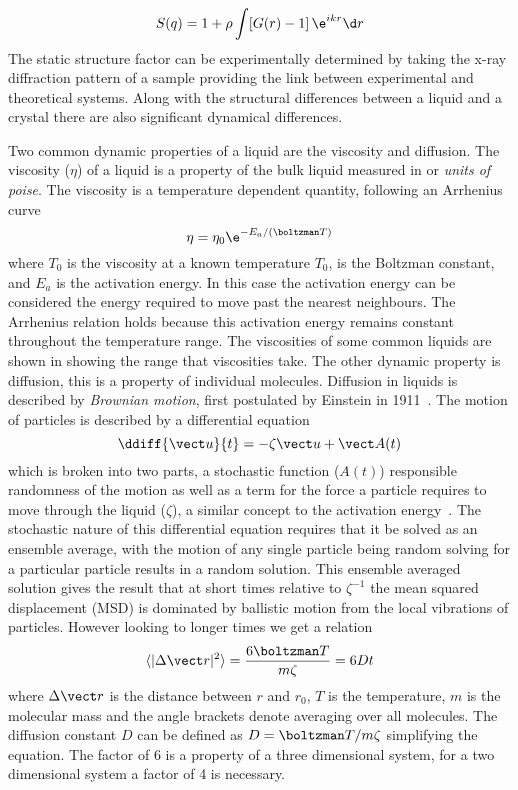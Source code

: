 \begin{equation}
    S(q) = 1 + \rho \int [G(r)-1]\,\e^{ikr} \d r
\end{equation}
The static structure factor can be experimentally determined by taking the x-ray diffraction pattern of a sample providing the link between experimental and theoretical systems. Along with the structural differences between a liquid and a crystal there are also significant dynamical differences.

\begin{figure}
    \caption{}
    \label{fig:radial distribution}
\end{figure}

Two common dynamic properties of a liquid are the viscosity and diffusion. The viscosity ($\eta$) of a liquid is a property of the bulk liquid measured in \si{\poise} or \emph{units of poise}. The viscosity is a temperature dependent quantity, following an Arrhenius curve
\begin{equation}
    \eta = \eta_0 \e^{-E_a/(\boltzman T)}
\end{equation}
where $T_0$ is the viscosity at a known temperature $T_0$, \boltzman is the Boltzman constant, and $E_a$ is the activation energy. In this case the activation energy can be considered the energy required to move past the nearest neighbours. The Arrhenius relation holds because this activation energy remains constant throughout the temperature range. The viscosities of some common liquids are shown in \tabref{} showing the range that viscosities take. The other dynamic property is diffusion, this is a property of individual molecules. Diffusion in liquids is described by \emph{Brownian motion}, first postulated by Einstein in 1911~\tocheck. The motion of particles is described by a differential equation 
\begin{equation}
    \ddiff{\vect u}{t} = - \zeta\vect u + \vect A(t)
\end{equation}
which is broken into two parts, a stochastic function ($A(t)$) responsible randomness of the motion as well as a term for the force a particle requires to move through the liquid ($\zeta$), a similar concept to the activation energy~\cite{mcquarrie:76}. The stochastic nature of this differential equation requires that it be solved as an ensemble average, with the motion of any single particle being random solving for a particular particle results in a random solution. This ensemble averaged solution gives the result that at short times relative to $\zeta^{-1}$ the mean squared displacement (MSD) is dominated by ballistic motion from the local vibrations of particles. However looking to longer times we get a relation
\begin{equation}
    \langle |\Delta \vect r|^2 \rangle = \frac{6\boltzman T}{m\zeta} = 6Dt
\end{equation}
where $\Delta \vect r$ is the distance between $r$ and $r_0$, $T$ is the temperature, $m$ is the molecular mass and the angle brackets denote averaging over all molecules. The diffusion constant $D$ can be defined as $D = \boltzman T/m\zeta$ simplifying the equation. The factor of 6 is a property of a three dimensional system, for a two dimensional system a factor of 4 is necessary.


